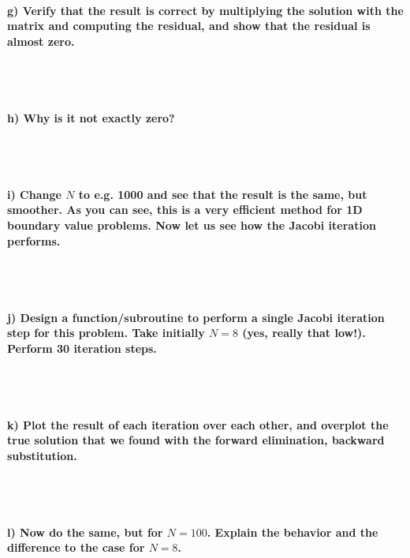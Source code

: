 \paragraph{
    g) Verify that the result is correct by multiplying the solution
    with the matrix and computing the residual, and show that the
    residual is almost zero.
} \ \\
    \\

\paragraph{
    h) Why is it not exactly zero?
} \ \\
    \\

\paragraph{
    i) Change $N$ to e.g. 1000 and see that the result is the same, but
    smoother. As you can see, this is a very efficient method for 1D
    boundary value problems. Now let us see how the Jacobi iteration
    performs.
} \ \\
    \\

\paragraph{
    j) Design a function/subroutine to perform a single Jacobi iteration
    step for this problem. Take initially $N=8$ (yes, really that low!).
    Perform 30 iteration steps.
} \ \\
    \\

\paragraph{
    k) Plot the result of each iteration over each other, and overplot
    the true solution that we found with the forward elimination,
    backward substitution.
} \ \\
    \\

\paragraph{
    l) Now do the same, but for $N=100$. Explain the behavior and the
    difference to the case for $N=8$.
}
